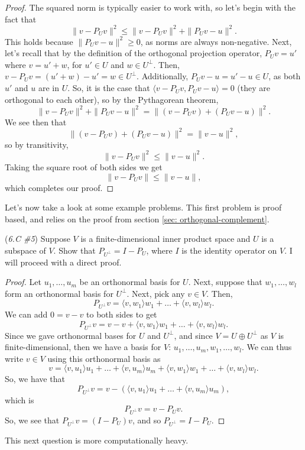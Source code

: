 \documentclass{article}
\newcommand{\la}{\langle}
\newcommand{\ra}{\rangle}
\theoremstyle{definition}
\begin{document}
\begin{proof}
    The squared norm is typically easier to work with, so let's begin with the fact that $$\|v - P_Uv\|^2 \leq \|v - P_Uv\|^2 + \|P_Uv - u\|^2.$$ This holds because $\|P_Uv - u\|^2 \geq 0$, as norms are always non-negative. Next, let's recall that by the definition of the orthogonal projection operator, $P_Uv = u'$ where $v = u' + w$, for $u' \in U$ and $w \in U^\perp$. Then, $v - P_Uv = (u' + w) - u' = w \in U^\perp$. Additionally, $P_Uv - u = u' - u \in U$, as both $u'$ and $u$ are in $U$. So, it is the case that $\la v - P_Uv, P_Uv - u \ra = 0$ (they are orthogonal to each other), so by the Pythagorean theorem, $$\|v - P_Uv\|^2 + \|P_Uv - u\|^2 = \|(v - P_Uv) + (P_Uv - u)\|^2.$$ We see then that $$\|(v - P_Uv) + (P_Uv - u)\|^2 = \|v - u\|^2,$$ so by transitivity, $$\|v - P_Uv\|^2 \leq \|v - u\|^2.$$ Taking the square root of both sides we get $$\|v - P_Uv\| \leq \|v - u\|,$$ which completes our proof.
\end{proof}
Let's now take a look at some example problems. This first problem is proof based, and relies on the proof from section \ref{sec: orthogonal-complement}.
\begin{problem}{(\textit{6.C \#5}) Suppose $V$ is a finite-dimensional inner product space and $U$ is a subspace of $V$. Show that $P_{U^\perp} = I - P_U$, where $I$ is the identity operator on $V$.}
    I will proceed with a direct proof.
    \begin{proof}
        Let $u_1, \dots, u_m$ be an orthonormal basis for $U$. Next, suppose that $w_1, \dots, w_l$ form an orthonormal basis for $U^\perp$. Next, pick any $v \in V$. Then, $$P_{U^\perp}v = \la v, w_1 \ra w_1 + \dots + \la v, w_l \ra w_l.$$
        We can add $0 = v - v$ to both sides to get $$P_{U^\perp}v = v - v + \la v, w_1 \ra w_1 + \dots + \la v, w_l \ra w_l.$$ Since we gave orthonormal bases for $U$ and $U^\perp$, and since $V = U \oplus U^\perp$ as $V$ is finite-dimensional, then we have a basis for $V$: $u_1, \dots, u_m, w_1, \dots, w_l$. We can thus write $v \in V$ using this orthonormal basis as $$v = \la v, u_1 \ra u_1 + \dots + \la v, u_m \ra u_m + \la v, w_1 \ra w_1 + \dots + \la v, w_l \ra w_l.$$
        So, we have that $$P_{U^\perp}v = v - (\la v, u_1 \ra u_1 + \dots + \la v, u_m \ra u_m),$$ which is $$P_{U^\perp}v = v - P_Uv.$$ So, we see that $P_{U^\perp}v = (I - P_U)v$, and so $P_{U^\perp} = I - P_U$.
    \end{proof}
\end{problem}
This next question is more computationally heavy.
\end{document}
